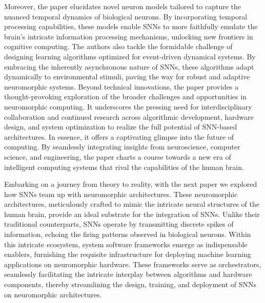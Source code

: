 \documentclass[screen, acmtog]{acmart}
\begin{document}
Moreover, the paper elucidates novel neuron models tailored to capture the nuanced temporal dynamics of biological neurons. By incorporating temporal processing capabilities, these models enable SNNs to more faithfully emulate the brain's intricate information processing mechanisms, unlocking new frontiers in cognitive computing. The authors also tackle the formidable challenge of designing learning algorithms optimized for event-driven dynamical systems. By embracing the inherently asynchronous nature of SNNs, these algorithms adapt dynamically to environmental stimuli, paving the way for robust and adaptive neuromorphic systems. Beyond technical innovations, the paper provides a thought-provoking exploration of the broader challenges and opportunities in neuromorphic computing. It underscores the pressing need for interdisciplinary collaboration and continued research across algorithmic development, hardware design, and system optimization to realize the full potential of SNN-based architectures. In essence, it offers a captivating glimpse into the future of computing. By seamlessly integrating insights from neuroscience, computer science, and engineering, the paper charts a course towards a new era of intelligent computing systems that rival the capabilities of the human brain.

Embarking on a journey from theory to reality, with the next paper we explored how SNNs team up with neuromorphic architectures\cite{SNNreview}. These neuromorphic architectures, meticulously crafted to mimic the intricate neural structures of the human brain, provide an ideal substrate for the integration of SNNs. Unlike their traditional counterparts, SNNs operate by transmitting discrete spikes of information, echoing the firing patterns observed in biological neurons. Within this intricate ecosystem, system software frameworks emerge as indispensable enablers, furnishing the requisite infrastructure for deploying machine learning applications on neuromorphic hardware. These frameworks serve as orchestrators, seamlessly facilitating the intricate interplay between algorithms and hardware components, thereby streamlining the design, training, and deployment of SNNs on neuromorphic architectures.
\end{document}
